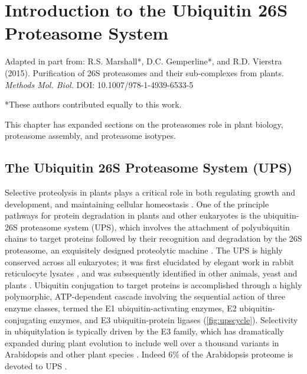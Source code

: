 \chapter{Introduction to the Ubiquitin 26S Proteasome System}

Adapted in part from: R.S. Marshall*, D.C. Gemperline*, and R.D. Vierstra (2015). Purification of 26S proteasomes and their sub-complexes from plants. \textit{Methods Mol. Biol.} DOI: 10.1007/978-1-4939-6533-5

*These authors contributed equally to this work.

This chapter has expanded sections on the proteasomes role in plant biology, proteasome assembly, and proteasome isotypes. 

\section{The Ubiquitin 26S Proteasome System (UPS)}
	Selective proteolysis in plants plays a critical role in both regulating growth and development, and maintaining cellular homeostasis \citep{nelson14, smalle04, vierstra93, vierstra09}.  One of the principle pathways for protein degradation in plants and other eukaryotes is the ubiquitin-26S proteasome system (UPS), which involves the attachment of polyubiquitin chains to target proteins followed by their recognition and degradation by the 26S proteasome, an exquisitely designed proteolytic machine \citep{bhattacharyya14, finley09, vierstra09}.  The UPS is highly conserved across all eukaryotes; it was first elucidated by elegant work in rabbit reticulocyte lysates \citep{ciechanover80, ciechanover80-frAQB, etlinger77, hershko80, wilkinson80}, and was subsequently identified in other animals, yeast and plants \citep{ciechanover84, finley84, finley87, glotzer91, hochstrasser91, shanklin87}.  Ubiquitin conjugation to target proteins is accomplished through a highly polymorphic, ATP-dependent cascade involving the sequential action of three enzyme classes, termed the E1 ubiquitin-activating enzymes, E2 ubiquitin-conjugating enzymes, and E3 ubiquitin-protein ligases \citep{berndsen14, smalle04, vierstra09} (\ref{fig:upscycle}).  Selectivity in ubiquitylation is typically driven by the E3 family, which has dramatically expanded during plant evolution to include well over a thousand variants in Arabidopsis and other plant species \citep{hua13, hua11}. Indeed 6\% of the Arabidopsis proteome is devoted to UPS \citep{smalle04}. 

